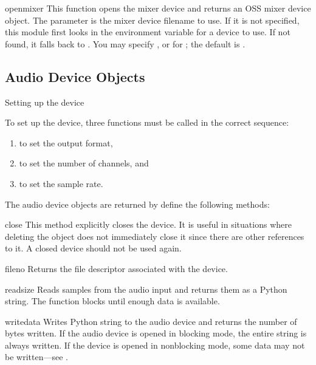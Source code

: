\begin{funcdesc}{openmixer}{} This function
opens the mixer device and returns an OSS mixer device object.  The
 parameter is the mixer device filename to use.  If it is
not specified, this module first looks in the environment variable
 for a device to use.  If not found, it falls back to
.  You may specify ,  or
 for ; the default is .

\end{funcdesc}

\subsection{Audio Device Objects \label{ossaudio-device-objects}}

Setting up the device

To set up the device, three functions must be called in the correct
sequence:
\begin{enumerate}
\item {} to set the output format,
\item {} to set the number of channels, and
\item {} to set the sample rate.
\end{enumerate}

The audio device objects are returned by  define the
following methods:

\begin{methoddesc}{close}{}
This method explicitly closes the device.  It is useful in situations
where deleting the object does not immediately close it since there are
other references to it.  A closed device should not be used again.
\end{methoddesc}

\begin{methoddesc}{fileno}{}
Returns the file descriptor associated with the device.
\end{methoddesc}

\begin{methoddesc}{read}{size}
Reads  samples from the audio input and returns them as a
Python string.  The function blocks until enough data is available.
\end{methoddesc}

\begin{methoddesc}{write}{data}
Writes Python string  to the audio device and returns the
number of bytes written.  If the audio device is opened in blocking
mode, the entire string is always written.  If the device is opened in
nonblocking mode, some data may not be written---see
.
\end{methoddesc}

